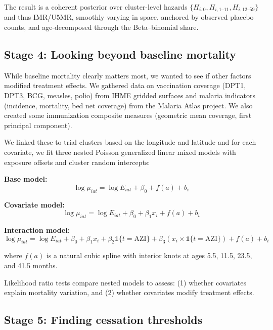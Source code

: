 \documentclass[11pt]{article}\usepackage[]{graphicx}\usepackage[]{xcolor}
\begin{document}
The result is a coherent posterior over cluster-level hazards \(\{H_{i,0},H_{i,1\text{--}11},H_{i,12\text{--}59}\}\) and thus IMR/U5MR, smoothly varying in space, anchored by observed placebo counts, and age-decomposed through the Beta–binomial share.

\subsection{Stage 4: Looking beyond baseline mortality}

While baseline mortality clearly matters most, we wanted to see if other factors modified treatment effects. We gathered data on vaccination coverage (DPT1, DPT3, BCG, measles, polio) from IHME gridded surfaces \citep{golding2017lancet} and malaria indicators (incidence, mortality, bed net coverage) from the Malaria Atlas project. We also created some immunization composite measures (geometric mean coverage, first principal component).

We linked these to trial clusters based on the longitude and latitude and for each covariate, we fit three nested Poisson generalized linear mixed models with exposure offsets and cluster random intercepts:

\textbf{Base model:}
\begin{equation}
\log \mu_{iat} = \log E_{iat} + \beta_0 + f(a) + b_i
\end{equation}

\textbf{Covariate model:}
\begin{equation}
\log \mu_{iat} = \log E_{iat} + \beta_0 + \beta_1 x_i + f(a) + b_i
\end{equation}

\textbf{Interaction model:}
\begin{equation}
\log \mu_{iat} = \log E_{iat} + \beta_0 + \beta_1 x_i + \beta_2 \mathbb{1}\{t=\text{AZI}\} + \beta_3 (x_i \times \mathbb{1}\{t=\text{AZI}\}) + f(a) + b_i
\end{equation}

where $f(a)$ is a natural cubic spline with interior knots at ages 5.5, 11.5, 23.5, and 41.5 months.

Likelihood ratio tests compare nested models to assess: (1) whether covariates explain mortality variation, and (2) whether covariates modify treatment effects.

\subsection{Stage 5: Finding cessation thresholds}
\end{document}
